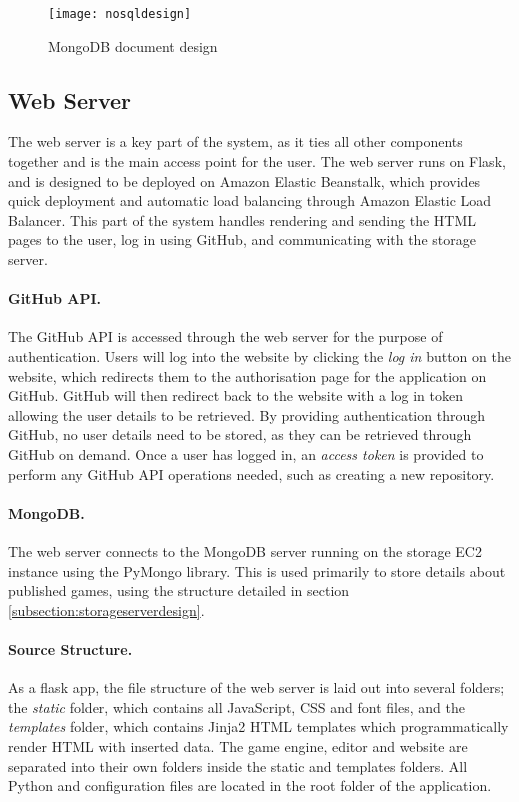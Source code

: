 	\begin{figure}[h]
		\centering
		\texttt{[image: nosqldesign]}
		\caption{MongoDB document design}
		\label{fig:nosqldesign}
	\end{figure}

	\subsection{Web Server}
	The web server is a key part of the system, as it ties all other components together and is the main access point for the user. The web server runs on Flask, and is designed to be deployed on Amazon Elastic Beanstalk, which provides quick deployment and automatic load balancing through Amazon Elastic Load Balancer. This part of the system handles rendering and sending the HTML pages to the user, log in using GitHub, and communicating with the storage server.

	\paragraph{GitHub API.}
	The GitHub API is accessed through the web server for the purpose of authentication. Users will log into the website by clicking the \emph{log in} button on the website, which redirects them to the authorisation page for the application on GitHub. GitHub will then redirect back to the website with a log in token allowing the user details to be retrieved. By providing authentication through GitHub, no user details need to be stored, as they can be retrieved through GitHub on demand. Once a user has logged in, an \emph{access token} is provided to perform any GitHub API operations needed, such as creating a new repository.

	\paragraph{MongoDB.}
	The web server connects to the MongoDB server running on the storage EC2 instance using the PyMongo library. This is used primarily to store details about published games, using the structure detailed in section \ref{subsection:storageserverdesign}.

	\paragraph{Source Structure.}
	As a flask app, the file structure of the web server is laid out into several folders; the \emph{static} folder, which contains all JavaScript, CSS and font files, and the \emph{templates} folder, which contains Jinja2 HTML templates which programmatically render HTML with inserted data. The game engine, editor and website are separated into their own folders inside the static and templates folders. All Python and configuration files are located in the root folder of the application.

